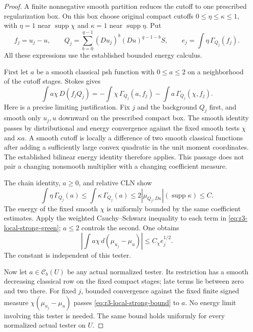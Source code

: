 \documentclass[11pt,a4paper]{article}
\numberwithin{equation}{section}
\theoremstyle{definition}
\theoremstyle{remark}
\begin{document}
\begin{proof}
A finite nonnegative smooth partition reduces the cutoff to
one prescribed regularization box. On this box choose original
compact cutoffs $0\leq\eta\leq\kappa\leq1$, with $\eta=1$ near
$\operatorname{supp}\chi$ and $\kappa=1$ near
$\operatorname{supp}\eta$. Put
\[
 f_j=u_j-u,\qquad
 Q_j=\sum_{b=0}^{q-1}(Du_j)^b(Du)^{q-1-b}S,\qquad
 e_j=\int\eta\,\Gamma_{Q_j}(f_j).
\]
All these expressions use the established bounded energy calculus.

First let $a$ be a smooth classical psh function with $0\leq a\leq2$
on a neighborhood of the cutoff stages. Stokes gives
\begin{equation}
 \int a\chi\,D(f_jQ_j)
 =-\int\chi\,\Gamma_{Q_j}(a,f_j)
          -\int a\,\Gamma_{Q_j}(\chi,f_j).
 \label{eq:r3-local-strong-green}
\end{equation}
Here is a precise limiting justification. Fix $j$ and the background
$Q_j$ first, and smooth only $u_j,u$ downward on the prescribed
compact box. The smooth identity passes by distributional and
energy convergence against the fixed smooth tests $\chi$ and
$\kappa a$. A smooth cutoff is locally a difference of two smooth
classical functions after adding a sufficiently large convex
quadratic in the unit moment coordinates. The established
bilinear energy identity therefore applies. This passage does not
pair a changing nonsmooth multiplier with a changing coefficient
measure.

The chain identity, $a\geq0$, and relative CLN show
\[
 \int\eta\,\Gamma_{Q_j}(a)
 \leq\int\kappa\,\Gamma_{Q_j}(a)
 \leq2|\mu_{Q_j,D\kappa}|(\operatorname{supp}\kappa)\leq C.
\]
The energy of the fixed smooth $\chi$ is uniformly bounded by the
same coefficient estimates. Apply the weighted Cauchy--Schwarz
inequality to each term in
\eqref{eq:r3-local-strong-green}; $a\leq2$ controls the second.
One obtains
\begin{equation}
 \left|\int a\chi\,d(\mu_{u_j}-\mu_u)\right|
                  \leq C_\chi e_j^{1/2}.
 \label{eq:r3-local-strong-bound}
\end{equation}
The constant is independent of this tester.

Now let $a\in\mathcal C_b(U)$ be any actual normalized tester.
Its restriction has a smooth decreasing classical row on the
fixed compact stages; late terms lie between zero and two there.
For fixed $j$, bounded convergence against the fixed finite signed
measure $\chi(\mu_{u_j}-\mu_u)$ passes
\eqref{eq:r3-local-strong-bound} to $a$. No energy limit involving
this tester is needed. The same bound holds uniformly for every
normalized actual tester on $U$.


\end{proof}
\end{document}
